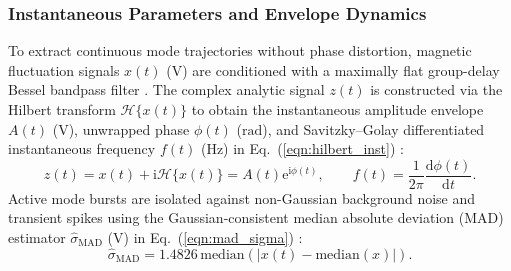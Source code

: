 \subsubsection{Instantaneous Parameters and Envelope Dynamics}
To extract continuous mode trajectories without phase distortion, magnetic fluctuation signals $x(t)$ ($\mathrm{V}$) are conditioned with a maximally flat group-delay Bessel bandpass filter \cite{zang2019observation}. The complex analytic signal $z(t)$ is constructed via the Hilbert transform $\mathcal{H}\{x(t)\}$ to obtain the instantaneous amplitude envelope $A(t)$ ($\mathrm{V}$), unwrapped phase $\phi(t)$ ($\mathrm{rad}$), and Savitzky--Golay differentiated instantaneous frequency $f(t)$ ($\mathrm{Hz}$) in Eq.~(\ref{eqn:hilbert_inst}) \cite{boashash2015time, Fabus2021}:
\begin{equation}
\label{eqn:hilbert_inst}
z(t) = x(t) + \mathrm{i}\mathcal{H}\{x(t)\} = A(t)\mathrm{e}^{\mathrm{i}\phi(t)}, \qquad f(t) = \frac{1}{2\pi}\frac{\mathrm{d}\phi(t)}{\mathrm{d}t}.
\end{equation}
Active mode bursts are isolated against non-Gaussian background noise and transient spikes using the Gaussian-consistent median absolute deviation (MAD) estimator $\hat{\sigma}_{\mathrm{MAD}}$ ($\mathrm{V}$) in Eq.~(\ref{eqn:mad_sigma}) \cite{RousseeuwCroux1993, james2021statistical}:
\begin{equation}
\label{eqn:mad_sigma}
\hat{\sigma}_{\mathrm{MAD}} = 1.4826\,\mathrm{median}\!\left(\left|x(t) - \mathrm{median}(x)\right|\right).
\end{equation}

